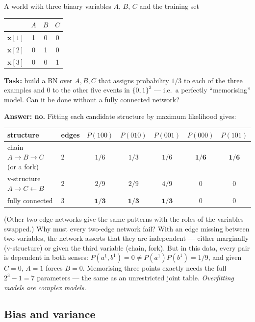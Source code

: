 \documentclass[11pt, oneside]{book}
\newcommand{\bx}{\mathbf{x}}  \newcommand{\by}{\mathbf{y}}
\let\originalsubsection\subsection
\renewcommand{\subsection}{\Needspace{6\baselineskip}\originalsubsection}
\begin{document}
\begin{exbox}[title={Exercise from the slides: do overfitting models have to be complex?}]
A world with three binary variables $A$, $B$, $C$ and the training set
\begin{center}
\small
\begin{tabular}{@{}lccc@{}}
\toprule
& $A$ & $B$ & $C$ \\
\midrule
$\bx[1]$ & 1 & 0 & 0 \\
$\bx[2]$ & 0 & 1 & 0 \\
$\bx[3]$ & 0 & 0 & 1 \\
\bottomrule
\end{tabular}
\end{center}
\textbf{Task:} build a BN over $A, B, C$ that assigns probability $1/3$ to each
of the three examples and $0$ to the other five events in $\{0,1\}^3$ --- i.e.\
a perfectly ``memorising'' model. Can it be done without a fully connected
network?\par\smallskip
\textbf{Answer: no.} Fitting each candidate structure by maximum likelihood
gives:
\begin{center}
\small
\begin{tabular}{@{}llccccc@{}}
\toprule
structure & edges & $P(100)$ & $P(010)$ & $P(001)$ & $P(000)$ & $P(101)$ \\
\midrule
chain $A \to B \to C$ (or a fork) & 2 & $1/6$ & $1/3$ & $1/6$ & $\mathbf{1/6}$ & $\mathbf{1/6}$ \\
v-structure $A \to C \leftarrow B$ & 2 & $2/9$ & $2/9$ & $4/9$ & 0 & 0 \\
fully connected & 3 & $\mathbf{1/3}$ & $\mathbf{1/3}$ & $\mathbf{1/3}$ & 0 & 0 \\
\bottomrule
\end{tabular}
\end{center}
(Other two-edge networks give the same patterns with the roles of the
variables swapped.) Why must every two-edge network fail? With an edge
missing between two variables, the network asserts that they are independent
--- either marginally (v-structure) or given the third variable (chain,
fork). But in this data, every pair is dependent in both senses: $P(a^1, b^1)
= 0 \neq P(a^1)P(b^1) = 1/9$, and given $C = 0$, $A = 1$ forces $B = 0$.
Memorising three points exactly needs the full $2^3 - 1 = 7$ parameters ---
the same as an unrestricted joint table. \emph{Overfitting models are complex
models.}
\end{exbox}

\subsection{Bias and variance}
\label{sec:bias-variance}
\end{document}
